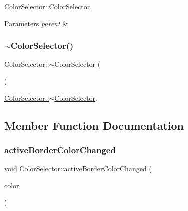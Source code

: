 \hyperlink{class_color_selector_aa8669eb9e5da7ca151ef84fba84a5f34}{Color\+Selector\+::\+Color\+Selector}. 


\begin{DoxyParams}{Parameters}
{\em parent} & \\
\hline
\end{DoxyParams}
\mbox{\label{class_color_selector_a8c5de1d7bf1515c11ba0157e2b11aff4}} 
\subsubsection{\texorpdfstring{$\sim$\+Color\+Selector()}{~ColorSelector()}}
{\footnotesize\ttfamily Color\+Selector\+::$\sim$\+Color\+Selector (\begin{DoxyParamCaption}{ }\end{DoxyParamCaption})}



\hyperlink{class_color_selector_a8c5de1d7bf1515c11ba0157e2b11aff4}{Color\+Selector\+::$\sim$\+Color\+Selector}. 



\subsection{Member Function Documentation}
\mbox{\label{class_color_selector_a3ba85a89666dd1ccb6e4274550e60e84}} 
\subsubsection{\texorpdfstring{active\+Border\+Color\+Changed}{activeBorderColorChanged}}
{\footnotesize\ttfamily void Color\+Selector\+::active\+Border\+Color\+Changed (\begin{DoxyParamCaption}\item[{Q\+Color}]{color }\end{DoxyParamCaption})\hspace{0.3cm}{\ttfamily [signal]}}



